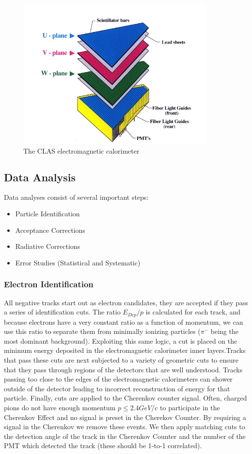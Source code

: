 \begin{figure}
  \centering
  \includegraphics[width=10cm]{image/ec.png}
  \caption{The CLAS electromagnetic calorimeter}
  \label{fig:ec_clas}
\end{figure}

\subsection{Data Analysis}
Data analyses consist of several important steps:

\begin{itemize}
\item Particle Identification
\item Acceptance Corrections
\item Radiative Corrections
\item Error Studies (Statistical and Systematic)
\end{itemize}

\subsubsection{Electron Identification}
All negative tracks start out as electron candidates, they are accepted if they pass a series of identification cuts. The ratio $E_{Dep}/p$ is calculated for each track, and because electrons have a very constant ratio as a function of momentum, we can use this ratio to separate them from minimally ionizing particles ($\pi^{-}$ being the most dominant background).  Exploiting this same logic, a cut is placed on the minimum energy deposited in the electromagnetic calorimeter inner layers.Tracks that pass these cuts are next subjected to a variety of geometric cuts to ensure that they pass through regions of the detectors that are well understood.  Tracks passing too close to the edges of the electromagnetic calorimeters can shower outside of the detector leading to incorrect reconstruction of energy for that particle.  Finally, cuts are applied to the Cherenkov counter signal.  Often, charged pions do not have enough momentum $p \leq 2.4 GeV/c$ to participate in the Cherenkov Effect and no signal is preset in the Cherekov Counter.  By requiring a signal in the Cherenkov we remove these events.  We then apply matching cuts to the detection angle of the track in the Cherenkov Counter and the number of the PMT which detected the track (these should be 1-to-1 correlated).  

